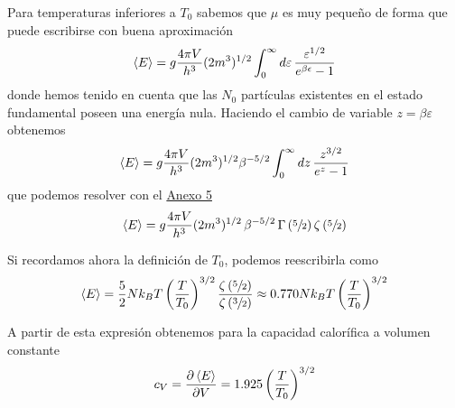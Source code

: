 Para temperaturas inferiores a $T_0$ sabemos que $\mu$ es muy pequeño de forma que puede escribirse con buena aproximación
\begin{equation}
	\expval{E} = g \frac{4\pi V}{h^3} (2m^3)^{1/2} \int_0^{\infty} \dd{\varepsilon} \frac{\varepsilon^{1/2}}{e^{ \beta\epsilon} - 1}
\end{equation}
donde hemos tenido en cuenta que las $N_0$ partículas existentes en el estado fundamental poseen una energía nula.
Haciendo el cambio de variable $z = \beta\varepsilon$ obtenemos
\begin{equation}
	\expval{E} = g \frac{4\pi V}{h^3} (2m^3)^{1/2} \beta^{-5/2} \int_0^{\infty} \dd{z} \frac{z^{3/2}}{e^z - 1}
\end{equation}
que podemos resolver con el \hyperref[Anx5]{Anexo 5}
\begin{equation}
	\expval{E} = g \frac{4\pi V}{h^3} (2m^3)^{1/2} \, \beta^{-5/2} \, \Gamma\left( \sfrac{5}{2} \right) \zeta\left( \sfrac{5}{2} \right) 
\end{equation}

Si recordamos ahora la definición de $T_0$, podemos reescribirla como
\begin{equation}
	\expval{E} = \frac{5}{2} Nk_BT \left( \frac{T}{T_0} \right)^{3/2} \frac{\zeta\left( \sfrac{5}{2} \right)}{\zeta\left( \sfrac{3}{2} \right)} \approx 0.770 Nk_BT \left( \frac{T}{T_0} \right)^{3/2}
\end{equation}

A partir de esta expresión obtenemos para la capacidad calorífica a volumen constante
\begin{equation}
	c_V = \pdv{\expval{E}}{V} = 1.925 \left( \frac{T}{T_0} \right)^{3/2}
\end{equation}